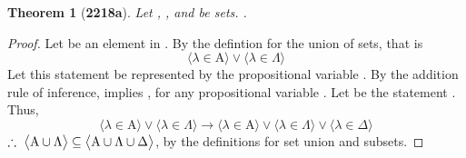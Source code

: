 \documentclass[preview]{standalone}
\newtheorem{theorem}{Theorem}
\begin{document}
\begin{theorem}[\textbf{2218a}]
    Let , \bm{$\Lambda$}, and \bm{$\Delta$} be sets. 
    .
\end{theorem}
\begin{proof}
    Let \bm{$\lambda$} be an element in . 
    By the defintion for the union of sets, that is
    \begin{equation*}
        \Big \langle \lambda \in \mathrm{A} \Big \rangle
            \lor 
        \Big \langle \lambda \in \Lambda \Big \rangle
    \end{equation*}
    Let this statement be represented by the propositional variable . 
    By the addition rule of inference,  implies , 
    for any propositional variable . 
    Let  be the statement \bm{$\lambda \in \Delta$}. 
    Thus,
    \begin{equation*}
        \Big \langle \lambda \in \mathrm{A} \Big \rangle
            \lor 
        \Big \langle \lambda \in \Lambda \Big \rangle
            \rightarrow
        \Big \langle \lambda \in \mathrm{A} \Big \rangle
            \lor 
        \Big \langle \lambda \in \Lambda \Big \rangle
            \lor
        \Big \langle \lambda \in \Delta \Big \rangle
    \end{equation*}
    $\therefore \text{\space} \relax{
    \big \langle \mathrm{A} \cup \Lambda \big \rangle
        \subseteq 
    \big \langle \mathrm{A} \cup \Lambda \cup \Delta \big \rangle
    }
    $,
    by the definitions for set union and subsets.
\end{proof}
\end{document}
